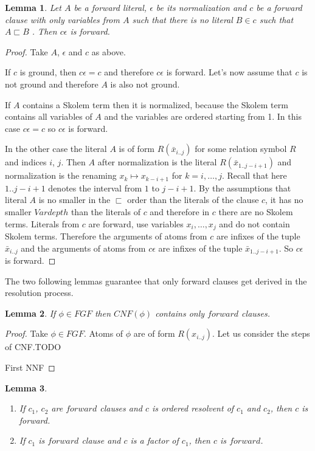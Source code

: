\documentclass[english, shortabstract]{iithesis}
\theoremstyle{definition} \newtheorem{definition}{Definition}[chapter]
\theoremstyle{remark} \newtheorem{remark}[definition]{Observation}
\theoremstyle{plain} \newtheorem{theorem}[definition]{Theorem}
\theoremstyle{plain} \newtheorem{lemma}[definition]{Lemma}
\begin{document}
\begin{lemma}\label{lem:normalization}
Let $A$ be a forward literal, $\epsilon$ be its normalization and $c$ be a forward clause with only variables from $A$ 
such that there is no literal $B\in c$ such that $A\sqsubset B$ .
Then $c\epsilon$ is forward.
\end{lemma}
\begin{proof}
Take $A$, $\epsilon$ and $c$ as above.

If $c$ is ground, then $c\epsilon=c$ and therefore $c\epsilon$ is forward.
Let's now assume that $c$ is not ground and therefore $A$ is also not ground.

If $A$ contains a Skolem term then it is normalized, 
because the Skolem term contains all variables of $A$ and the variables are ordered starting from 1.
In this case $c\epsilon=c$ so $c\epsilon$ is forward.

In the other case the literal $A$ is of form $R(\bar{x}_{i..j})$ for some relation symbol $R$ and indices $i$, $j$.
Then $A$ after normalization is the literal $R(\bar{x}_{1..j-i+1})$ and normalization is the renaming $x_k\mapsto x_{k-i+1}$ for $k=i,\dots,j$.
Recall that here $1..j-i+1$ denotes the interval from $1$ to $j-i+1$.
By the assumptions that literal $A$ is no smaller in the $\sqsubset$ order than the literals of the clause $c$, 
it has no smaller $\mathit{Vardepth}$ than the literals of $c$ and therefore in $c$ there are no Skolem terms.
Literals from $c$ are forward, use variables $x_i, \dots, x_j$ and do not contain Skolem terms.
Therefore the arguments of atoms from $c$ are infixes of the tuple $\bar{x}_{i..j}$ and 
the arguments of atoms from $c\epsilon$ are infixes of the tuple $\bar{x}_{1..j-i+1}$.
So $c\epsilon$ is forward.
\end{proof}

The two following lemmas guarantee that only forward clauses get derived in the resolution process.
\begin{lemma}
If $\phi \in \mathit{FGF}$ then $\mathit{CNF}(\phi)$ contains only $forward$ clauses.
\end{lemma}

\begin{proof}
Take $\phi \in \mathit{FGF}$. Atoms of $\phi$ are of form $R(x_{i..j})$.
Let us consider the steps of CNF.TODO

First NNF
\end{proof}

\begin{lemma}
\begin{enumerate}
    \item If $c_1$, $c_2$ are $forward$ clauses and $c$ is ordered resolvent of $c_1$ and $c_2$, then $c$ is forward.
    \item If $c_1$ is $forward$ clause and $c$ is a factor of $c_1$, then $c$ is $forward$.  
\end{enumerate}
\end{lemma}
\end{document}
